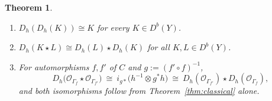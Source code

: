 \documentclass[11pt]{amsart}
\newtheorem{theorem}{Theorem}[section]
\theoremstyle{definition}
\theoremstyle{remark}
\begin{document}
\begin{theorem}\label{thm:antiinv}
\begin{enumerate}
\item[(a)] $D_h(D_h(K))\cong K$ for every $K\in D^{b}(Y)$.
\item[(b)] $D_h(K\star L)\cong D_h(L)\star D_h(K)$ for all $K,L\in D^{b}(Y)$.
\item[(c)] For automorphisms $f,f'$ of $C$ and $g:=(f'\circ f)^{-1}$,
\[
D_h\bigl(\mathcal O_{\Gamma_f}\star\mathcal O_{\Gamma_{f'}}\bigr)\ \cong\
i_{g*}\bigl(h^{-1}\otimes g^{*}h\bigr)\ \cong\
D_h(\mathcal O_{\Gamma_{f'}})\star D_h(\mathcal O_{\Gamma_f}),
\]
and both isomorphisms follow from Theorem~\ref{thm:classical} alone.
\end{enumerate}
\end{theorem}
\end{document}
